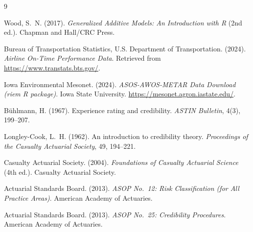 \documentclass[12pt, a4paper]{article}
\begin{document}

\begin{thebibliography}{9}

Wood, S.~N. (2017).
\textit{Generalized Additive Models: An Introduction with R} (2nd ed.).
Chapman and Hall/CRC Press.

Bureau of Transportation Statistics, U.S. Department of Transportation. (2024).
\textit{Airline On-Time Performance Data}.
Retrieved from \url{https://www.transtats.bts.gov/}.

Iowa Environmental Mesonet. (2024).
\textit{ASOS-AWOS-METAR Data Download (riem R package)}.
Iowa State University. \url{https://mesonet.agron.iastate.edu/}.

Bühlmann, H. (1967).
Experience rating and credibility.
\textit{ASTIN Bulletin}, 4(3), 199--207.

Longley-Cook, L.~H. (1962).
An introduction to credibility theory.
\textit{Proceedings of the Casualty Actuarial Society}, 49, 194--221.

Casualty Actuarial Society. (2004).
\textit{Foundations of Casualty Actuarial Science} (4th ed.).
Casualty Actuarial Society.

Actuarial Standards Board. (2013).
\textit{ASOP No.\ 12: Risk Classification (for All Practice Areas)}.
American Academy of Actuaries.

Actuarial Standards Board. (2013).
\textit{ASOP No.\ 25: Credibility Procedures}.
American Academy of Actuaries.

\end{thebibliography}
\end{document}
